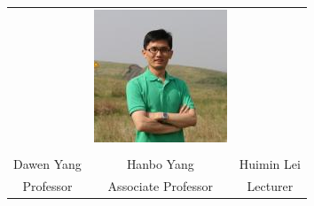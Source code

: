 \documentclass{beamer}
\begin{document}
\begin{CJK}{UTF8}{gkai}
{{\begin{table}
{\begin{tabular}{ccc}
&\begin{minipage}{.3\textwidth}\includegraphics[width=\linewidth]{huiminlei.jpg}\end{minipage}
\\
\\
\hline
Dawen Yang &Hanbo Yang & Huimin Lei\\
Professor&Associate Professor&Lecturer
\\
\hline
\end{tabular}
}
\end{table}
  }

















  }
\end{CJK}
\end{document}
